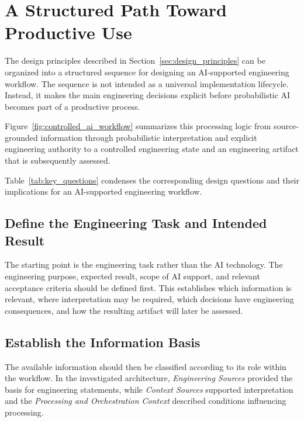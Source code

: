\section{A Structured Path Toward Productive Use}
\label{sec:path}

The design principles described in Section~\ref{sec:design_principles} can be organized
into a structured sequence for designing an AI-supported engineering workflow. The
sequence is not intended as a universal implementation lifecycle. Instead, it makes the
main engineering decisions explicit before probabilistic AI becomes part of a productive
process.

Figure~\ref{fig:controlled_ai_workflow} summarizes this processing logic from
source-grounded information through probabilistic interpretation and explicit engineering
authority to a controlled engineering state and an engineering artifact that is
subsequently assessed.



Table~\ref{tab:key_questions} condenses the corresponding design questions and their
implications for an AI-supported engineering workflow.



\subsection{Define the Engineering Task and Intended Result}
\label{sec:path_task}

The starting point is the engineering task rather than the AI technology. The engineering
purpose, expected result, scope of AI support, and relevant acceptance criteria should be
defined first. This establishes which information is relevant, where interpretation may be
required, which decisions have engineering consequences, and how the resulting artifact
will later be assessed.

\subsection{Establish the Information Basis}
\label{sec:path_information}

The available information should then be classified according to its role within the
workflow. In the investigated architecture, \emph{Engineering Sources} provided the basis
for engineering statements, while \emph{Context Sources} supported interpretation and the
\emph{Processing and Orchestration Context} described conditions influencing processing.

